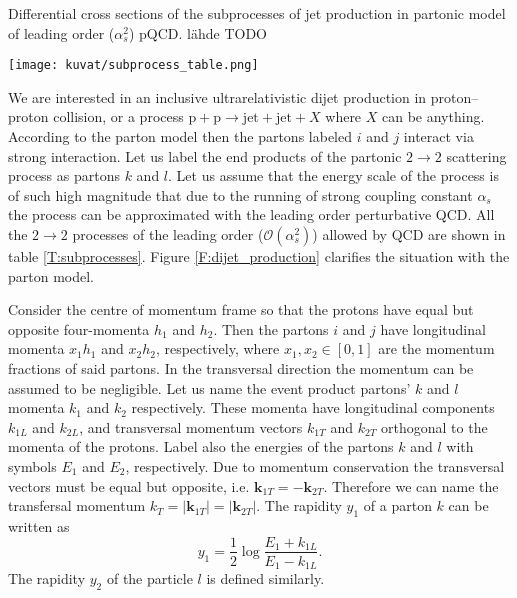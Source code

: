 \documentclass[a4paper, twoside, english, 12pt]{article}
\begin{document}
\begin{table}[htp]
	\centering
	\caption{Differential cross sections of the subprocesses of jet production in partonic model of leading order ($\alpha_s^2$) pQCD. lähde TODO }
	\label{T:subprocesses}
	\begin{adjustwidth}{-1cm}{-2cm}
		\texttt{[image: kuvat/subprocess\_table.png]}
	\end{adjustwidth}
\end{table}

We are interested in an inclusive ultrarelativistic dijet production in proton--proton collision, or a process $\text{p}+\text{p}\rightarrow\text{jet}+\text{jet}+X$ where $X$ can be anything. According to the parton model then the partons labeled $i$ and $j$ interact via strong interaction. Let us label the end products of the partonic $2\rightarrow2$ scattering process as partons $k$ and $l$. Let us assume that the energy scale of the process is of such high magnitude that due to the running of strong coupling constant $\alpha_s$ the process can be approximated with the leading order perturbative QCD. All the $2\rightarrow2$ processes of the leading order ($\mathcal{O}(\alpha_s^2)$) allowed by QCD are shown in table \ref{T:subprocesses}. Figure \ref{F:dijet_production} clarifies the situation with the parton model.

Consider the centre of momentum frame so that the protons have equal but opposite four-momenta $h_1$ and $h_2$. Then the partons $i$ and $j$ have longitudinal momenta $x_1h_1$ and $x_2h_2$, respectively, where $x_1,x_2\in {[0,1]}$ are the momentum fractions of said partons. In the transversal direction the momentum can be assumed to be negligible. Let us name the event product partons' $k$ and $l$ momenta $k_1$ and $k_2$ respectively. These momenta have longitudinal components $k_{1L}$ and $k_{2L}$, and transversal momentum vectors $k_{1T}$ and $k_{2T}$ orthogonal to the momenta of the protons. Label also the energies of the partons $k$ and $l$ with symbols $E_1$ and $E_2$, respectively. Due to momentum conservation the transversal vectors must be equal but opposite, i.e. $\mathbf{k}_{1T}=-\mathbf{k}_{2T}$. Therefore we can name the transfersal momentum $k_{T}=|\mathbf{k}_{1T}|=|\mathbf{k}_{2T}|$. The rapidity $y_1$ of a parton $k$ can be written as
\begin{equation}\label{E:rapidity}
y_1=\frac{1}{2}\log\frac{E_1+k_{1L}}{E_1-k_{1L}}.
\end{equation}
The rapidity $y_2$ of the particle $l$ is defined similarly.
\end{document}
